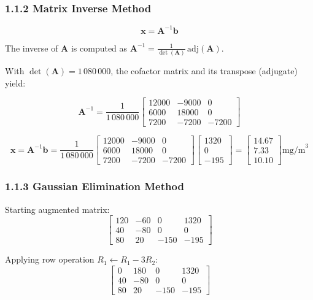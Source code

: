 \documentclass[12pt,a4paper]{article}
\begin{document}
\subsubsection{1.1.2 Matrix Inverse Method}

\[
\mathbf{x} = \mathbf{A}^{-1}\mathbf{b}
\]

The inverse of $\mathbf{A}$ is computed as $\mathbf{A}^{-1} = \frac{1}{\det(\mathbf{A})}\,\text{adj}(\mathbf{A})$.

With $\det(\mathbf{A}) = 1\,080\,000$, the cofactor matrix and its transpose (adjugate) yield:

\[
\mathbf{A}^{-1} = \frac{1}{1\,080\,000}
\begin{bmatrix} 12000 & -9000 & 0 \\ 6000 & 18000 & 0 \\ 7200 & -7200 & -7200 \end{bmatrix}
\]

\[
\mathbf{x} = \mathbf{A}^{-1}\mathbf{b} =
\frac{1}{1\,080\,000}
\begin{bmatrix} 12000 & -9000 & 0 \\ 6000 & 18000 & 0 \\ 7200 & -7200 & -7200 \end{bmatrix}
\begin{bmatrix} 1320 \\ 0 \\ -195 \end{bmatrix}
=
\begin{bmatrix} 14.67 \\ 7.33 \\ 10.10 \end{bmatrix}
\text{mg/m}^3
\]

\subsubsection{1.1.3 Gaussian Elimination Method}

Starting augmented matrix:
\[
\left[\begin{array}{ccc|c}
120 & -60 & 0 & 1320\\
40 & -80 & 0 & 0\\
80 & 20 & -150 & -195
\end{array}\right]
\]

Applying row operation $R_1 \leftarrow R_1 - 3R_2$:
\[
\left[\begin{array}{ccc|c}
0 & 180 & 0 & 1320\\
40 & -80 & 0 & 0\\
80 & 20 & -150 & -195
\end{array}\right]
\]
\end{document}
